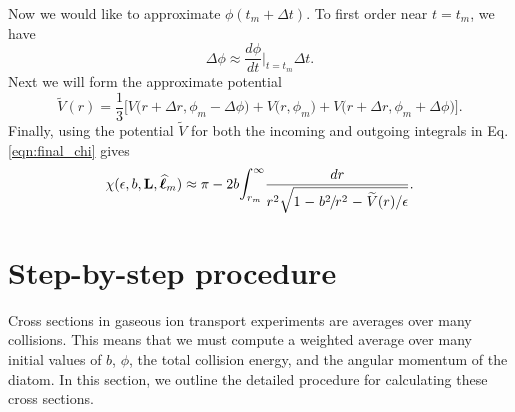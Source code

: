\documentclass[article]{revtex4-2}
\begin{document}
Now we would like to approximate $\phi(t_m + \Delta t)$. To first order near $t=t_m$, we have
\begin{equation}
    \Delta \phi \approx \frac{d\phi}{dt}\bigg|_{t=t_m}\Delta t.
    \label{eqn:delta_phi}
\end{equation}
Next we will form the approximate potential
\begin{equation}
    \widetilde{V}(r) = \frac{1}{3}\Big[ V\big(r+\Delta r, \phi_m - \Delta \phi \big) + V\big(r, \phi_m\big) + V\big(r+\Delta r, \phi_m + \Delta \phi\big)\Big].
    \label{eqn:v0_tilde}
\end{equation}
Finally, using the potential $\widetilde{V}$ for both the incoming and outgoing integrals in Eq. \ref{eqn:final_chi} gives
\begin{equation}
    \chi(\epsilon, b, \mathbf{L}, \widehat{\boldsymbol{\ell}}_m) \approx \pi - 2b \mathlarger{\int}_{r_m}^{\infty} \frac{dr}{r^2\sqrt{1 \mkern1mu - \mkern1mu  b^2 \mkern-2mu/\mkern-2mu r^2 \mkern1mu - \mkern1mu \widetilde{V}(r)/\epsilon}}.
    \label{eqn:final_approx_chi}
\end{equation}

\section{Step-by-step procedure}
Cross sections in gaseous ion transport experiments are averages over many collisions. This means that we must compute a weighted average over many initial values of $b$, $\phi$, the total collision energy, and the angular momentum of the diatom. In this section, we outline the detailed procedure for calculating these cross sections.
\end{document}
